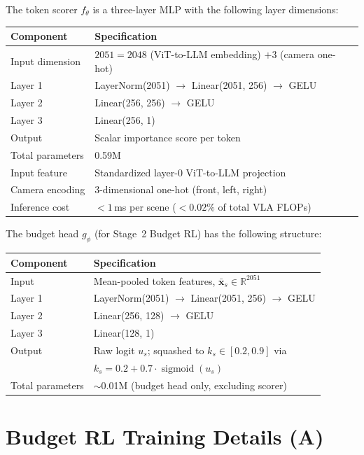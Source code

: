 \documentclass[letterpaper]{article}
\begin{document}
The token scorer $f_\theta$ is a three-layer MLP with the following layer dimensions:
\begin{center}
\begin{tabular}{@{}ll@{}}
\toprule
Component & Specification \\
\midrule
Input dimension & $2051 = 2048$ (ViT-to-LLM embedding) $+ 3$ (camera one-hot) \\
Layer 1 & LayerNorm(2051) $\to$ Linear(2051, 256) $\to$ GELU \\
Layer 2 & Linear(256, 256) $\to$ GELU \\
Layer 3 & Linear(256, 1) \\
Output & Scalar importance score per token \\
Total parameters & 0.59M \\
\midrule
Input feature & Standardized layer-0 ViT-to-LLM projection \\
Camera encoding & 3-dimensional one-hot (front, left, right) \\
Inference cost & $<1$\,ms per scene ($<0.02\%$ of total VLA FLOPs) \\
\bottomrule
\end{tabular}
\end{center}

The budget head $g_\phi$ (for Stage~2 Budget RL) has the following structure:
\begin{center}
\begin{tabular}{@{}ll@{}}
\toprule
Component & Specification \\
\midrule
Input & Mean-pooled token features, $\bar{\mathbf{x}}_s \in \mathbb{R}^{2051}$ \\
Layer 1 & LayerNorm(2051) $\to$ Linear(2051, 256) $\to$ GELU \\
Layer 2 & Linear(256, 128) $\to$ GELU \\
Layer 3 & Linear(128, 1) \\
Output & Raw logit $u_s$; squashed to $k_s \in [0.2, 0.9]$ via \\
       & $k_s = 0.2 + 0.7 \cdot \operatorname{sigmoid}(u_s)$ \\
Total parameters & $\sim$0.01M (budget head only, excluding scorer) \\
\bottomrule
\end{tabular}
\end{center}

\section{Budget RL Training Details (A)}
\label{sec:training}
\end{document}
